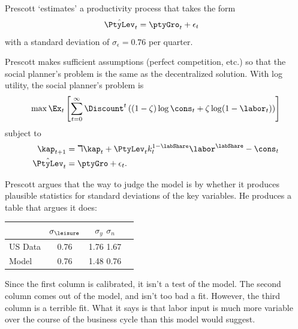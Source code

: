Prescott `estimates' a productivity process that takes the form
\begin{equation}\begin{gathered}\begin{aligned}
        \hat{\PtyLev}_{t} & =  \ptyGro_{t} + \epsilon_{t}
\end{aligned}\end{gathered}\end{equation}
with a standard deviation of $\sigma_{\epsilon} = 0.76$ per quarter.

Prescott makes sufficient assumptions (perfect competition, etc.)  so
that the social planner's problem is the same as the decentralized
solution.  With log utility, the social planner's problem is
\begin{equation}
        \max \Ex_{t}\left[\sum_{t=0}^{\infty}\Discount^{t} \left((1-\zeta) \log \cons_{t} + \zeta \log (1-\labor_{t})\right)\right] \label{eq:objlog}
\end{equation}
subject to
\begin{equation}\begin{gathered}\begin{aligned}
        \kap_{t+1} & =  \daleth \kap_{t}+\PtyLev_{t}k^{1-\labShare}_{t}\labor^{\labShare} - \cons_{t}  \\
        \hat{\PtyLev}_{t} & =  \ptyGro + \epsilon_{t}.
\end{aligned}\end{gathered}\end{equation}

Prescott argues that the way to judge the model is by whether it
produces plausible statistics for standard deviations of the
key variables.  He produces a table that argues it does:

\begin{table}[ht]
\center
\begin{tabular}{lccc}
                 & $\sigma_{\leisure }$  & $\sigma_{y}$   $\sigma_{n}$ \\ \hline
   US Data       & 0.76          & 1.76           1.67
\\ Model         & 0.76          & 1.48           0.76
\end{tabular}
\end{table}

Since the first column is calibrated, it isn't a test of the model.
The second column comes out of the model, and isn't too bad a fit.
However, the third column is a terrible fit.  What it says is that
labor input is much more variable over the course of the business
cycle than this model would suggest.

